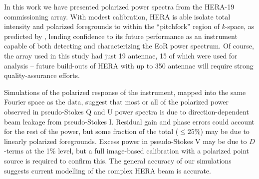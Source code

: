 In this work we have presented polarized power spectra from the HERA-19 commissioning array. With modest calibration, HERA is able isolate total intensity and polarized foregrounds to within the ``pitchfork'' region of \textit{k}-space, as predicted by \cite{Nithya.15b}, lending confidence to its future performance as an instrument capable of both detecting and characterizing the EoR power spectrum. Of course, the array used in this study had just 19 antennae, 15 of which were used for analysis -- future build-outs of HERA with up to 350 antennae will require strong quality-assurance efforts.

Simulations of the polarized response of the instrument, mapped into the same Fourier space as the data, suggest that most or all of the polarized power observed in pseudo-Stokes Q and U power spectra is due to direction-dependent beam leakage from pseudo-Stokes I. Residual gain and phase errors could account for the rest of the power, but some fraction of the total ($\leqslant 25\%$) may be due to linearly polarized foregrounds. Excess power in pseudo-Stokes V may be due to $D$-terms at the 1\% level, but a full image-based calibration with a polarized point source is required to confirm this. The general accuracy of our simulations suggests current modelling of the complex HERA beam is accurate.